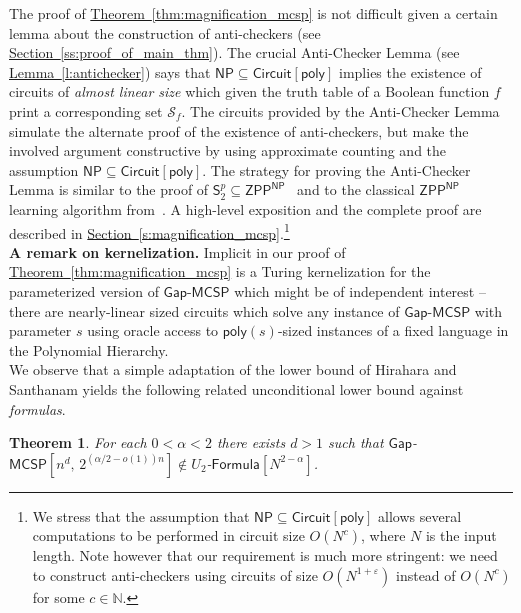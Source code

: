 \documentclass[11pt]{article}
\numberwithin{equation}{section}
\newtheorem{theorem}{Theorem}[section]
\theoremstyle{definition}
\theoremstyle{plain}
\newcommand{\expref}[2]{\hyperref[#2]{#1~\ref{#2}}}
\newcommand{\gapmcsp}{\mathsf{Gap}$-$\mathsf{MCSP}}
\begin{document}
The proof of \expref{Theorem}{thm:magnification_mcsp} is not difficult given a certain lemma about the construction of anti-checkers (see \expref{Section}{ss:proof_of_main_thm}). The crucial Anti-Checker Lemma (see \expref{Lemma}{l:antichecker}) says that $\mathsf{NP} \subseteq \mathsf{Circuit}[\mathsf{poly}]$ implies the existence of circuits of \emph{almost linear size} which given the truth table of a Boolean function $f$ print a corresponding set $\mathcal{S}_f$. The circuits provided by the Anti-Checker Lemma simulate the alternate proof of the existence of anti-checkers, but make the involved argument constructive by using approximate counting and the assumption $\mathsf{NP} \subseteq \mathsf{Circuit}[\mathsf{poly}]$. The strategy for proving the Anti-Checker Lemma is similar to the proof of $\mathsf{S}^p_2\subseteq \mathsf{ZPP}^\mathsf{NP}$~\cite{DBLP:journals/jcss/Cai07} and to the classical $\mathsf{ZPP}^\mathsf{NP}$ learning algorithm from~\cite{DBLP:journals/jcss/BshoutyCGKT96}. A high-level exposition and the complete proof are described in \expref{Section}{s:magnification_mcsp}.\footnote{We stress that the assumption that $\mathsf{NP} \subseteq \mathsf{Circuit}[\mathsf{poly}]$ allows several computations to be performed in circuit size $O(N^c)$, where $N$ is the input length. Note however that our requirement is much more stringent: we need to construct anti-checkers using circuits of size $O(N^{1 + \varepsilon})$ instead of $O(N^c)$ for some $c \in \mathbb{N}$.}\\



\noindent \textbf{A remark on kernelization.} Implicit in our proof of \expref{Theorem}{thm:magnification_mcsp} is a Turing kernelization for the parameterized
version of $\mathsf{Gap}$-$\mathsf{MCSP}$ which might be of independent interest -- there are nearly-linear sized
circuits which solve any instance of $\mathsf{Gap}$-$\mathsf{MCSP}$ with parameter $s$ using oracle access to $\mathsf{poly}(s)$-sized
instances of a fixed language in the Polynomial Hierarchy.\\


We observe that a simple adaptation of the lower bound of Hirahara and Santhanam \cite[Section 4]{DBLP:conf/coco/HiraharaS17} yields the following related unconditional lower bound against \emph{formulas}.

\begin{theorem}\label{thm:lower_bound_mcsp} For each $0 < \alpha < 2$ there exists $d > 1$ such that $\gapmcsp[n^d,\, 2^{(\alpha/2 - o(1))n}] \notin U_2$-$\mathsf{Formula}[N^{2 - \alpha}]$.
\end{theorem}
\end{document}
